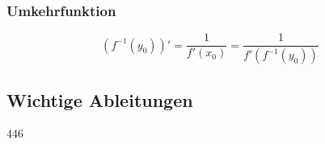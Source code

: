 \subsubsection{Umkehrfunktion}
\vspace{-0.2cm}
$$ (f^{-1}(y_0))' = \frac{1}{f'(x_0)} = \frac{1}{f'(f^{-1}(y_0))} $$ 


\subsection{Wichtige Ableitungen}{446}

